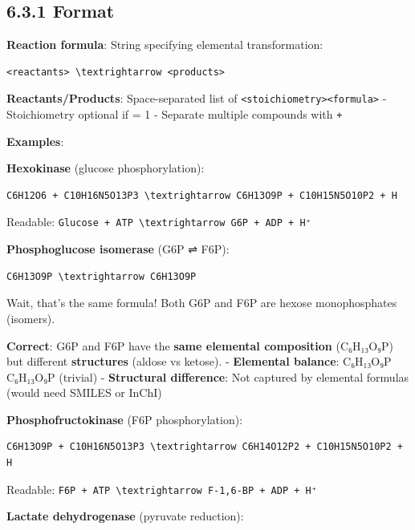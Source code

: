 \hypertarget{format}{%
\subsection{6.3.1 Format}\label{format}}

\textbf{Reaction formula}: String specifying elemental transformation:

\begin{lstlisting}
<reactants> \textrightarrow <products>
\end{lstlisting}

\textbf{Reactants/Products}: Space-separated list of
\passthrough{\lstinline!<stoichiometry><formula>!} - Stoichiometry
optional if = 1 - Separate multiple compounds with
\passthrough{\lstinline!+!}

\textbf{Examples}:

\textbf{Hexokinase} (glucose phosphorylation):

\begin{lstlisting}
C6H12O6 + C10H16N5O13P3 \textrightarrow C6H13O9P + C10H15N5O10P2 + H
\end{lstlisting}

Readable: \passthrough{\lstinline!Glucose + ATP \textrightarrow G6P + ADP + H⁺!}

\textbf{Phosphoglucose isomerase} (G6P ⇌ F6P):

\begin{lstlisting}
C6H13O9P \textrightarrow C6H13O9P
\end{lstlisting}

Wait, that's the same formula! Both G6P and F6P are hexose
monophosphates (isomers).

\textbf{Correct}: G6P and F6P have the \textbf{same elemental
composition} (C₆H₁₃O₉P) but different \textbf{structures} (aldose vs
ketose). - \textbf{Elemental balance}: C₆H₁₃O₉P \textrightarrow C₆H₁₃O₉P \checkmark (trivial) -
\textbf{Structural difference}: Not captured by elemental formulas
(would need SMILES or InChI)

\textbf{Phosphofructokinase} (F6P phosphorylation):

\begin{lstlisting}
C6H13O9P + C10H16N5O13P3 \textrightarrow C6H14O12P2 + C10H15N5O10P2 + H
\end{lstlisting}

Readable: \passthrough{\lstinline!F6P + ATP \textrightarrow F-1,6-BP + ADP + H⁺!}

\textbf{Lactate dehydrogenase} (pyruvate reduction):


